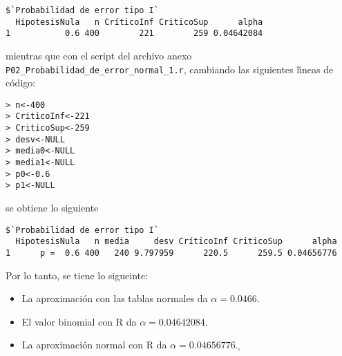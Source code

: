 \begin{solucion}
\begin{enumerate}
  \begin{verbatim}
$`Probabilidad de error tipo I`
  HipotesisNula   n CríticoInf CriticoSup      alpha
1           0.6 400        221        259 0.04642084
  \end{verbatim}
  \vspace{-0.5cm}
  mientras que con el script del archivo anexo \texttt{P02\_Probabilidad\_de\_error\_normal\_1.r}, cambiando las siguientes l\'{\i}neas de c\'odigo:
  \begin{verbatim}
> n<-400
> CriticoInf<-221
> CriticoSup<-259
> desv<-NULL
> media0<-NULL
> media1<-NULL
> p0<-0.6
> p1<-NULL
  \end{verbatim}
  \vspace{-0.5cm}
  se obtiene lo siguiente
  \begin{verbatim}
$`Probabilidad de error tipo I`
  HipotesisNula   n media     desv CríticoInf CriticoSup      alpha
1      p =  0.6 400   240 9.797959      220.5      259.5 0.04656776
  \end{verbatim}
  \vspace{-0.5cm}
  Por lo tanto, se tiene lo sigueinte:
  \begin{itemize}
   \item La aproximaci\'on con las tablas normales da $\alpha = 0.0466$.
   \item El valor binomial con R da $\alpha = 0.04642084$.
   \item La aproximaci\'on normal con R da $\alpha = 0.04656776$.${}_{\square}$
  \end{itemize}
  

\end{enumerate}
\end{solucion}
